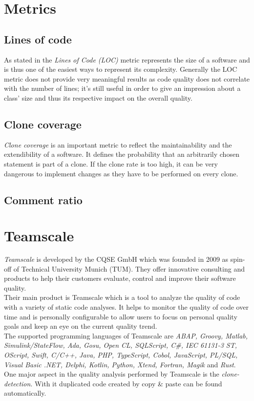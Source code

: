 \section{Metrics}
\subsection{Lines of code}
\copied
As stated in \cite{Bernwieser2014} the \textit{Lines of Code (LOC)} metric represents the size of a software and is thus one of the easiest ways to represent its complexity. Generally the LOC metric does not provide very meaningful results as code quality does not correlate with the number of lines; it’s still useful in order to give an impression about a class’ size and thus its respective impact on the overall quality.

\subsection{Clone coverage}
\copied
\textit{Clone coverage }is an important metric to reflect the maintainability
and the extendibility of a software. It defines the probability that an arbitrarily chosen statement is part of a clone. If the clone rate is too high, it can be very dangerous to implement changes as they have to be performed on every clone.

\subsection{Comment ratio}

\section{Teamscale}
\label{section:teamscale}
\textit{Teamscale} is developed by the CQSE GmbH which was founded in 2009 as spin-off of Technical University Munich (TUM). They offer innovative consulting and products to help their customers evaluate, control and improve their software quality. \\
Their main product is Teamscale which is a tool to analyze the quality of code with a variety of static code analyses. It helps to monitor the quality of code over time and is personally configurable to allow users to focus on personal quality goals and keep an eye on the current quality trend.\\
The supported programming languages of Teamscale are \textit{ABAP, Groovy, Matlab, Simulink/StateFlow, Ada, Gosu, Open CL, SQLScript, C\#, IEC 61131-3 ST, OScript, Swift, C/C++, Java, PHP, TypeScript, Cobol, JavaScript, PL/SQL, Visual Basic .NET, Delphi, Kotlin, Python, Xtend, Fortran, Magik} and \textit{Rust}.\\
One major aspect in the quality analysis performed by Teamscale is the \textit{clone-detection}. With it duplicated code created by copy \& paste can be found automatically.

